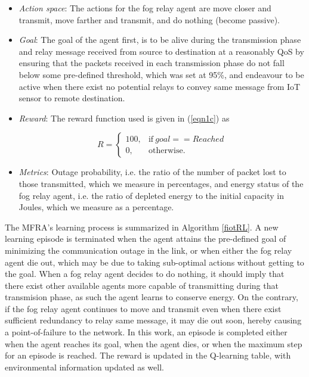 \documentclass[journal]{IEEEtran}
\begin{document}
\begin{itemize}
  \item \emph{Action space}: The actions for the fog relay agent are move closer and transmit, move farther and transmit, and do nothing (become passive).
  \item \emph{Goal}: The goal of the agent first, is to be alive during the transmission phase and relay message received from source to destination at a reasonably QoS by ensuring that the packets received in each transmission phase do not fall below some pre-defined threshold, which was set at 95\%, and endeavour to be active when there exist no potential relays to convey same message from IoT sensor to remote destination.
  \item \emph{Reward}: The reward function used is given in (\ref{eqn1c}) as

 \begin{equation}\label{eqn1c}
    R =
    \begin{cases}
      100, & \text{if}\ goal==Reached \\
      0, & \text{otherwise.}
    \end{cases}
  \end{equation}
  \item \emph{Metrics}: Outage probability, i.e. the ratio of the number of packet lost to those transmitted, which we measure in percentages, and energy status of the fog relay agent, i.e. the ratio of depleted energy to the initial capacity in Joules, which we measure as a percentage.
\end{itemize}

The MFRA's learning process is summarized in Algorithm \ref{fiotRL}. A new learning episode is terminated when the agent attains the pre-defined goal of minimizing the communication outage in the link, or when either the fog relay agent die out, which may be due to taking sub-optimal actions without getting to the goal. When a fog relay agent decides to do nothing, it should imply that there exist other available agents more capable of transmitting during that transmision phase, as such the agent learns to conserve energy. On the contrary, if the fog relay agent continues to move and transmit even when there exist sufficient redundancy to relay same message, it may die out soon, hereby causing a point-of-failure to the network. In this work, an episode is completed either when the agent reaches its goal, when the agent dies, or when the maximum step for an episode is reached. The reward is updated in the Q-learning table, with environmental information updated as well.
\end{document}
